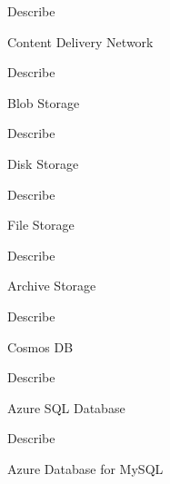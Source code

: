 \documentclass{scrartcl}
\newenvironment{flashcard}[2][]{%
    #1
    \vfill
    \centerline{\Large{#2}}
    \vfill
    \newpage
}
{\newpage}
\begin{document}
    \begin{flashcard}[Describe]{Content Delivery Network}

    \end{flashcard}

    \begin{flashcard}[Describe]{Blob Storage}

    \end{flashcard}

    \begin{flashcard}[Describe]{Disk Storage}

    \end{flashcard}

    \begin{flashcard}[Describe]{File Storage}

    \end{flashcard}

    \begin{flashcard}[Describe]{Archive Storage}

    \end{flashcard}

    \begin{flashcard}[Describe]{Cosmos DB}

    \end{flashcard}

    \begin{flashcard}[Describe]{Azure SQL Database}

    \end{flashcard}

    \begin{flashcard}[Describe]{Azure Database for MySQL}

    \end{flashcard}
\end{document}
